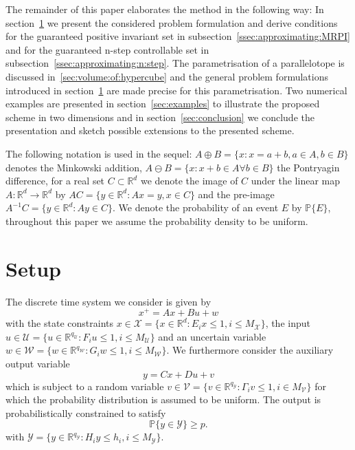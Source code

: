 \documentclass{ifacconf}
\providecommand{\W}{\mathcal W}
\providecommand{\V}{\mathcal V}
\providecommand{\X}{\mathcal X}
\providecommand{\Y}{\mathcal Y}
\providecommand{\U}{\mathcal U}
\providecommand{\PP}{\mathbb P}
\providecommand{\RR}{\mathbb R}
\begin{document}
The remainder of this paper elaborates the method in the following way:
%
In section~\ref{sec:setup} we present the considered problem formulation and derive conditions for the guaranteed positive invariant set in subsection~\ref{ssec:approximating:MRPI} and for the guaranteed n-step controllable set in subsection~\ref{ssec:approximating:n:step}.
%
The parametrisation of a parallelotope is discussed in~\ref{sec:volume:of:hypercube} and the general problem formulations introduced in section~\ref{sec:setup} are made precise for this parametrisation.
%
Two numerical examples are presented in section~\ref{sec:examples} to illustrate the proposed scheme in two dimensions and in section~\ref{sec:conclusion} we conclude the presentation and sketch possible extensions to the presented scheme.

The following notation is used in the sequel: $A\oplus B = \{x:x=a+b,a\in A,b\in B\}$ denotes the Minkowski addition, $A\ominus B = \{x: x+b \in A\forall b\in B\}$ the Pontryagin difference, for a real set $C\subset\RR^d$ we denote the image of $C$ under the linear map $A:\RR^d\rightarrow\RR^d$ by $AC = \{y\in\RR^d:Ax=y,x\in C\}$ and the pre-image $A^{-1}C = \{y\in\RR^d:Ay\in C\}$.
%
We denote the probability of an event $E$ by $\PP\{E\}$, throughout this paper we assume the probability density to be uniform.


\section{Setup}\label{sec:setup}
%


The discrete time system we consider is given by
%
\begin{equation}
	x^+ = Ax + Bu + w
\end{equation}
%
with the state constraints $x\in\X = \{x\in\RR^d:E_ix\leq 1, i\leq M_\X\}$, the input~$u\in\U = \{u\in\RR^{q_\U}:F_i u\leq 1, i\leq M_\U\}$ and an uncertain variable $w\in\W = \{w\in\RR^{q_\W}:G_i w\leq 1,i\leq M_\W\}$.
%
We furthermore consider the auxiliary output variable 
%
\begin{equation}
	y = Cx + Du + v
\end{equation}
%
which is subject to a random variable $v\in\V = \{v\in\RR^{q_\Y}:\Gamma_i v\leq 1,i\in M_\V\}$ for which the probability distribution is assumed to be uniform.
%
The output is probabilistically constrained to satisfy
%
\begin{equation}\label{eq:probabilistic:constraint}
	\PP\{y\in\Y\}\geq p.
\end{equation}
%
with $\Y=\{y\in\RR^{q_\Y}:H_i y\leq h_i, i\leq M_\Y\}$.
\end{document}
